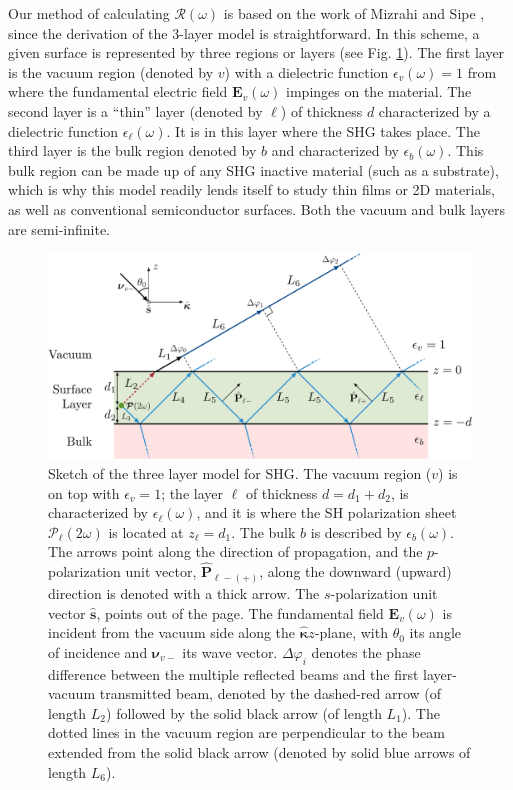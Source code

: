 \documentclass[aps,pra,10pt,amsmath,notitlepage,letterpaper]{revtex4-1}
\begin{document}
Our method of calculating $\mathcal{R}(\omega)$ is based on the work of Mizrahi
and Sipe \cite{mizrahiJOSA88}, since the derivation of the 3-layer model is
straightforward. In this scheme, a given surface is represented by three regions
or layers (see Fig. \ref{fig:MR3layer2w}). The first layer is the vacuum region
(denoted by $v$) with a dielectric function $\epsilon_{v}(\omega)=1$ from where
the fundamental electric field $\mathbf{E}_{v}(\omega)$ impinges on the
material. The second layer is a ``thin'' layer (denoted by $\ell$) of thickness
$d$ characterized by a dielectric function $\epsilon_{\ell}(\omega)$. It is in
this layer where the SHG takes place. The third layer is the bulk region denoted
by $b$ and characterized by $\epsilon_{b}(\omega)$. This bulk region can be made
up of any SHG inactive material (such as a substrate), which is why this model
readily lends itself to study thin films or 2D materials, as well as
conventional semiconductor surfaces. Both the vacuum and bulk layers are
semi-infinite.

\begin{figure}[b]
\centering 
\includegraphics[width=0.65\linewidth]{../../content/figures/diag-3layer_MR_2w}
\caption[Sketch of the three layer model for SHG.]
{Sketch of the three layer model for SHG. The vacuum region ($v$) is on top with
$\epsilon_{v}=1$; the layer $\ell$ of thickness $d = d_{1} + d_{2}$, is
characterized by $\epsilon_{\ell}(\omega)$, and it is where the SH polarization
sheet $\boldsymbol{\mathcal{P}}_{\ell}(2\omega)$ is located at $z_{\ell} =
d_{1}$. The bulk $b$ is described by $\epsilon_{b}(\omega)$. The arrows point
along the direction of propagation, and the $p$-polarization unit vector,
$\hat{\mathbf{P}}_{\ell -(+)}$, along the downward (upward) direction is denoted
with a thick arrow. The $s$-polarization unit vector $\hat{\mathbf{s}}$, points
out of the page. The fundamental field $\mathbf{E}_{v}(\omega)$ is incident from
the vacuum side along the $\hat{\boldsymbol{\kappa}}z$-plane, with $\theta_{0}$
its angle of incidence and $\boldsymbol{\nu}_{v-}$ its wave vector.
$\Delta\varphi_{i}$ denotes the phase difference between the multiple reflected
beams and the first layer-vacuum transmitted beam, denoted by the dashed-red
arrow (of length $L_{2}$) followed by the solid black arrow (of length $L_{1}$).
The dotted lines in the vacuum region are perpendicular to the beam extended
from the solid black arrow (denoted by solid blue arrows of length $L_{6}$).}
\label{fig:MR3layer2w}
\end{figure}
\end{document}
